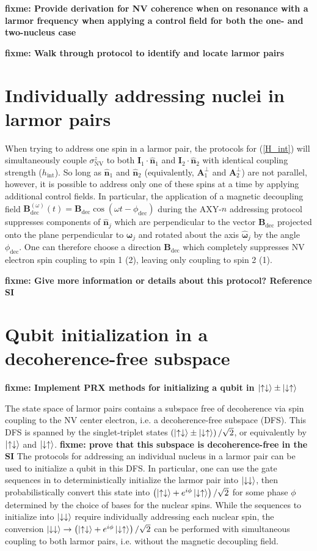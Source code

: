 \documentclass[twocolumn]{revtex4-1}
\renewcommand{\t}{\text} %
\newcommand{\p}[1]{\left(#1\right)} %
\renewcommand{\v}{\bm} %
\newcommand{\uv}[1]{\hat{\v{#1}}} %
\renewcommand{\c}{\cdot} %
\renewcommand{\u}{\uparrow}
\renewcommand{\d}{\downarrow}
\newcommand{\NV}{\t{NV}}
\newcommand{\fixme}[1]{{\bf \color{red} fixme: #1}}
\begin{document}
\fixme{Provide derivation for NV coherence when on resonance with a
  larmor frequency when applying a control field for both the one- and
  two-nucleus case}

\fixme{Walk through protocol to identify and locate larmor pairs}

\section{Individually addressing nuclei in larmor pairs}

When trying to address one spin in a larmor pair, the protocols for
(\ref{H_int}) will simultaneously couple $\sigma_\NV^z$ to both
$\v I_1\c\uv n_1$ and $\v I_2\c\uv n_2$ with identical coupling
strength ($h_\t{int}$). So long as $\uv n_1$ and $\uv n_2$
(equivalently, $\v A_1^\perp$ and $\v A_2^\perp$) are not parallel,
however, it is possible to address only one of these spins at a time
by applying additional control fields. In particular, the application
of a magnetic decoupling field
$\v B_\t{dec}^{\p\omega}\p{t}=\v B_\t{dec}\cos\p{\omega
  t-\phi_\t{dec}}$ during the AXY-$n$ addressing protocol suppresses
components of $\uv n_j$ which are perpendicular to the vector
$\v B_\t{dec}$ projected onto the plane perpendicular to $\v\omega_j$
and rotated about the axis $\uv\omega_j$ by the angle
$\phi_\t{dec}$. One can therefore choose a direction $\v B_\t{dec}$
which completely suppresses NV electron spin coupling to spin 1 (2),
leaving only coupling to spin 2 (1).

\fixme{Give more information or details about this protocol? Reference
  SI}

\section{Qubit initialization in a decoherence-free subspace}

\fixme{Implement PRX\cite{reiserer2016robust} methods for initializing
  a qubit in $\ket{\u\d}\pm\ket{\d\u}$}

The state space of larmor pairs contains a subspace free of
decoherence via spin coupling to the NV center electron, i.e. a
decoherence-free subspace (DFS). This DFS is spanned by the
singlet-triplet states $\p{\ket{\u\d}\pm\ket{\d\u}}/\sqrt2$, or
equivalently by $\ket{\u\d}$ and $\ket{\d\u}$. \fixme{prove that this
  subspace is decoherence-free in the SI} The protocols for addressing
an individual nucleus in a larmor pair can be used to initialize a
qubit in this DFS. In particular, one can use the gate sequences in
\cite{reiserer2016robust} to deterministically initialize the larmor
pair into $\ket{\d\d}$, then probabilistically convert this state into
$\p{\ket{\u\d}+e^{i\phi}\ket{\d\u}}/\sqrt2$ for some phase $\phi$
determined by the choice of bases for the nuclear spins. While the
sequences to initialize into $\ket{\d\d}$ require individually
addressing each nuclear spin, the conversion
$\ket{\d\d}\to\p{\ket{\u\d}+e^{i\phi}\ket{\d\u}}/\sqrt2$ can be
performed with simultaneous coupling to both larmor pairs,
i.e. without the magnetic decoupling field.
\end{document}
